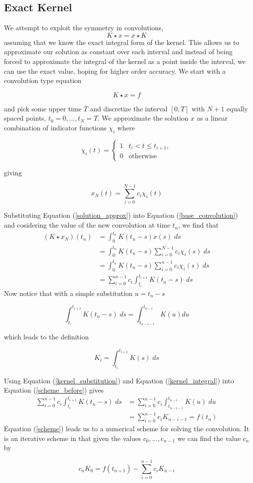 \documentclass[11pt]{article}
\numberwithin{equation}{section}
\theoremstyle{definition}
\newcommand{\eqn}[2]{
  \begin{equation}
    \label{#1}
    #2
  \end{equation}
}
\newcommand{\eqr}[1]{Equation (\ref{#1})}
\begin{document}
\subsection{Exact Kernel}
We attempt to exploit the symmetry in convolutions, 
$$
  K \star x = x \star K
$$
assuming that we know the exact integral form of the kernel. This allows us to
approximate our solution as constant over each interval and instead of being forced
to approximate the integral of the kernel as a point inside the interval, we can
use the exact value, hoping for higher order accuracy.
We start with a convolution type equation
\eqn{base_convolution}{
  K \star x = f
}
and pick some upper time $T$ and discretize the interval $[0, T]$ with $N+1$
equally spaced points, $t_0 = 0, ..., t_N = T$. We approximate the solution $x$
as a linear combination of indicator functions $\chi_i$ where
\eqn{indicator_defn}{
  \chi_i(t)
  =
  \left\{
  \begin{array}{ll}
    1 & t_{i} < t \leq t_{i+1} , \\
    0 & \text{otherwise}
  \end{array}
  \right.
}
giving
\eqn{solution_approx}{
  x_N(t) = \sum_{i=0}^{N-1} c_i \chi_i(t)
}
Substituting \eqr{solution_approx} into \eqr{base_convolution} and cosidering
the value of the new convolution at time $t_n$, we find that
\begin{align}
\nonumber             (K \star x_N)(t_n)
                        &= \int_0^{t_n} K(t_n - s)x(s)\; ds \\
\nonumber               &= \int_0^{t_n} K(t_n - s) \sum_{i=0}^{N-1} c_i \chi_i(s)\; ds \\
\nonumber               &= \int_0^{t_n} K(t_n - s) \sum_{i=0}^{n-1} c_i \chi_i(s)\; ds \\
\label{scheme_before}   &= \sum_{i=0}^{n-1} c_i \int_{t_i}^{t_{i+1}} K(t_n - s)\; ds
\end{align}
Now notice that with a simple substitution $u = t_n - s$
\eqn{kernel_substitution}{
  \int_{t_i}^{t_{i+1}}K(t_n - s)\; ds = \int_{t_{n-i-1}}^{t_{n-i}} K(u) du
}
which leads to the definition
\eqn{kernel_integral}{
  K_i = \int_{t_i}^{t_{i+1}} K(s)\; ds
}
Using \eqr{kernel_substitution} and \eqr{kernel_integral} into \eqr{scheme_before}
gives
\begin{align}
\nonumber       \sum_{i=0}^{n-1} c_i \int_{t_i}^{t_{i+1}} K(t_n - s)\; ds
                  &= \sum_{i=0}^{n-1} c_i \int_{t_{n-i-1}}^{t_{n-i}} K(u)\; du\\
\label{scheme}    &= \sum_{i=0}^{n-1} c_i K_{n-i-1} = f(t_n)
\end{align}
\eqr{scheme} leads us to a numerical scheme for solving the convolution. It is
an iterative scheme in that given the values $c_0, ..., c_{n-1}$ we can find
the value $c_n$ by
\eqn{specific_term}{
  c_nK_0 = f(t_{n+1}) - \sum_{i=0}^{n-1} c_i K_{n-i}
}
\end{document}
